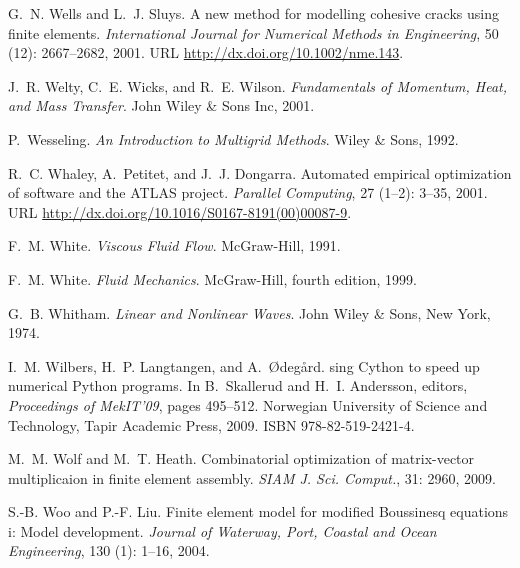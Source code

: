 \begin{thebibliography}{467}
G.~N. Wells and L.~J. Sluys.
\newblock A new method for modelling cohesive cracks using finite elements.
\newblock \emph{International Journal for Numerical Methods in Engineering},
  50 (12): 2667--2682, 2001.
\newblock URL \url{http://dx.doi.org/10.1002/nme.143}.

J.~R. Welty, C.~E. Wicks, and R.~E. Wilson.
\newblock \emph{Fundamentals of Momentum, Heat, and Mass Transfer}.
\newblock John Wiley \& Sons Inc, 2001.

P.~Wesseling.
\newblock \emph{An Introduction to Multigrid Methods}.
\newblock Wiley \& Sons, 1992.

R.~C. Whaley, A.~Petitet, and J.~J. Dongarra.
\newblock Automated empirical optimization of software and the {ATLAS} project.
\newblock \emph{Parallel Computing}, 27 (1--2): 3--35, 2001.
\newblock URL \url{http://dx.doi.org/10.1016/S0167-8191(00)00087-9}.

F.~M. White.
\newblock \emph{Viscous Fluid Flow}.
\newblock McGraw-Hill, 1991.

F.~M. White.
\newblock \emph{Fluid Mechanics}.
\newblock McGraw-Hill, fourth edition, 1999.

G.~B. Whitham.
\newblock \emph{Linear and Nonlinear Waves}.
\newblock John Wiley \& Sons, New York, 1974.

I.~M. Wilbers, H.~P. Langtangen, and A.~{\O}deg{\aa}rd.
sing {C}ython to speed up numerical {P}ython programs.
\newblock In B.~Skallerud and H.~I. Andersson, editors, \emph{Proceedings of
  MekIT'09}, pages 495--512. Norwegian University of Science and Technology,
  Tapir Academic Press, 2009.
\newblock ISBN 978-82-519-2421-4.

M.~M. Wolf and M.~T. Heath.
\newblock Combinatorial optimization of matrix-vector multiplicaion in finite
  element assembly.
\newblock \emph{SIAM J. Sci. Comput.}, 31: 2960, 2009.

S.-B. Woo and P.-F. Liu.
\newblock Finite element model for modified {B}oussinesq equations i: Model
  development.
\newblock \emph{Journal of Waterway, Port, Coastal and Ocean Engineering},
  130 (1): 1--16, 2004{}.


\end{thebibliography}
